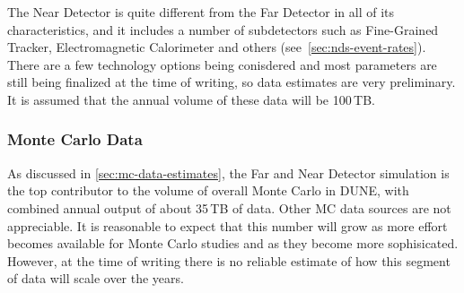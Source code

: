 The Near Detector is quite different from the Far Detector in all of its characteristics, and it includes a number of subdetectors
such as Fine-Grained Tracker, Electromagnetic Calorimeter and others (see~\ref{sec:nds-event-rates}). There are a few technology
options being conisdered and most parameters are still being finalized at the time of writing, so data estimates are very preliminary.
It is
assumed that the annual volume of these data will be 100\,TB.



\subsubsection{Monte Carlo Data}
As discussed in \ref{sec:mc-data-estimates}, the Far and Near Detector simulation is the top contributor to the volume of overall
Monte Carlo in DUNE, with combined annual output of about 35\,TB of data. Other MC data sources are not appreciable.
It is reasonable to expect that this number will grow as more effort becomes available for Monte Carlo studies and
as they become more sophisicated. However, at the time of writing there is no reliable estimate of how this segment of data
will scale over the years.


